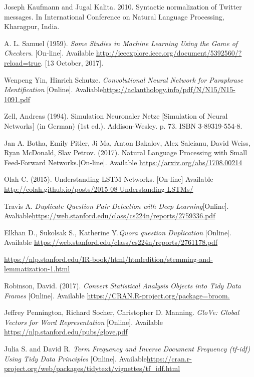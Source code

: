 \begin{thebibliography}{2}
Joseph Kaufmann and Jugal Kalita. 2010. Syntactic normalization of Twitter messages. In International Conference on Natural Language Processing, Kharagpur, India.



A. L. Samuel (1959). \textit{Some Studies in Machine Learning Using the Game of Checkers}. [On-line]. Available \url{http://ieeexplore.ieee.org/document/5392560/?reload=true}. [13 October, 2017].

Wenpeng Yin, Hinrich Schutze. \textit{Convolutional Neural Network for Paraphrase Identification} [Online]. Avaliable\url{https://aclanthology.info/pdf/N/N15/N15-1091.pdf}

Zell, Andreas (1994). Simulation Neuronaler Netze [Simulation of Neural Networks] (in German) (1st ed.). Addison-Wesley. p. 73. ISBN 3-89319-554-8.

Jan A. Botha, Emily Pitler, Ji Ma, Anton Bakalov, Alex Salcianu, David Weiss, Ryan McDonald, Slav Petrov. (2017). Natural Language Processing with Small Feed-Forward Networks.[On-line]. Available \url{https://arxiv.org/abs/1708.00214}

Olah C. (2015). Understanding LSTM Networks. [On-line] Available \url{http://colah.github.io/posts/2015-08-Understanding-LSTMs/}

Travis A. \textit{Duplicate Question Pair Detection with Deep Learning}[Online]. Avaliable\url{https://web.stanford.edu/class/cs224n/reports/2759336.pdf}

Elkhan D., Sukolsak S., Katherine Y.\textit{Quora question Duplication} [Online]. Available
\url{https://web.stanford.edu/class/cs224n/reports/2761178.pdf}

\url{https://nlp.stanford.edu/IR-book/html/htmledition/stemming-and-lemmatization-1.html}


Robinson, David. (2017). \textit{Convert Statistical Analysis Objects into Tidy Data Frames} [Online]. Available \url{https://CRAN.R-project.org/package=broom.}

Jeffrey Pennington, Richard Socher, Christopher D. Manning. \textit{GloVe: Global Vectors for Word Representation} [Online]. Available \url{https://nlp.stanford.edu/pubs/glove.pdf}


Julia S. and David R. \textit{Term Frequency and Inverse Document Frequency (tf-idf) Using Tidy Data Principles} [Online]. Available\url{https://cran.r-project.org/web/packages/tidytext/vignettes/tf_idf.html}


\end{thebibliography}
